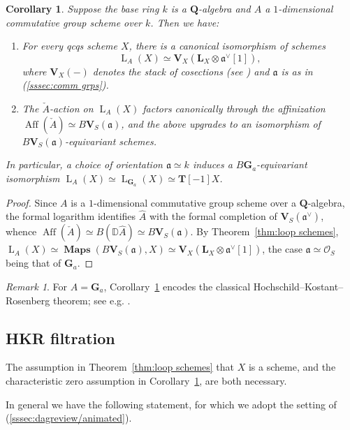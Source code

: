 \documentclass[12pt, oneside]{amsart}
\numberwithin{equation}{section}
\newtheorem{corollary}[subsubsection]{Corollary}
\theoremstyle{remark}
\newtheorem{remark}[subsubsection]{Remark}
\theoremstyle{plain}
\DeclareMathOperator{\MAP}{\mathbf{Maps}}
\newcommand{\fra}{\mathfrak{a}}
\newcommand{\frav}{\mathfrak{a}^\vee}
\newcommand{\Loop}{\operatorname{L}}
\newcommand{\OO}{\mathcal{O}}
\newcommand{\GGa}{\mathbf{G}_{a}}
\newcommand{\TT}{\mathbf{T}}
\newcommand{\LL}{\mathbf{L}}
\begin{document}
\begin{corollary}\label{cor:hkr0}
  Suppose the base ring $k$ is a $\mathbf{Q}$-algebra and $A$ a $1$-dimensional commutative group scheme over $k$.
  Then we have:
  \begin{enumerate}
	\item For every qcqs scheme $X$, there is a canonical isomorphism of schemes
  \[ \Loop_A(X) \simeq \mathbf{V}_X(\LL_X \otimes \frav[1]), \]
  where $\mathbf{V}_X(-)$ denotes the stack of cosections (see \cite[App.~B]{weilres}) and $\fra$ is as in (\ref{sssec:comm grps}).

  \item The $\check{A}$-action on $\Loop_A(X)$ factors canonically through the affinization $\operatorname{Aff}(\check{A}) \simeq B\mathbf{V}_S(\fra)$, and the above upgrades to an isomorphism of $B\mathbf{V}_S(\fra)$-equivariant schemes.
  \end{enumerate}
  In particular, a choice of orientation $\fra \simeq k$ induces a $B\GGa$-equivariant isomorphism $\Loop_A(X) \simeq \Loop_{\GGa}(X) \simeq \TT[-1]X$.
\end{corollary}
\begin{proof}
  Since $A$ is a $1$-dimensional commutative group scheme over a $\mathbf{Q}$-algebra, the formal logarithm identifies $\widehat{A}$ with the formal completion of $\mathbf{V}_S(\frav)$, whence $\operatorname{Aff}(\check{A}) \simeq B(\mathbb{D}\widehat{A}) \simeq B\mathbf{V}_S(\fra)$.
  By Theorem~\ref{thm:loop schemes}, $\Loop_A(X) \simeq \MAP(B\mathbf{V}_S(\fra), X) \simeq \mathbf{V}_X(\LL_X \otimes \frav[1])$, the case $\fra \simeq \OO_S$ being that of $\GGa$.
\end{proof}

\begin{remark}
  For $A=\GGa$, Corollary~\ref{cor:hkr0} encodes the classical Hochschild--Kostant--Rosenberg theorem; see e.g. \cite{BNloop}.
\end{remark}

\subsection{HKR filtration}\label{ssec:HKR fil}

The assumption in Theorem~\ref{thm:loop schemes} that $X$ is a scheme, and the characteristic zero assumption in Corollary~\ref{cor:hkr0}, are both necessary.

In general we have the following statement, for which we adopt the setting of (\ref{sssec:dagreview/animated}).
\end{document}
